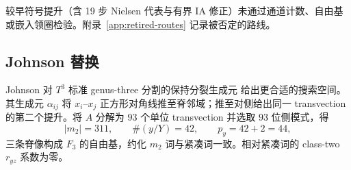\begin{remark}[被拒的紧凑提升]
较早符号提升（含 19 步 Nielsen 代表与有界 IA 修正）未通过通道计数、自由基或嵌入领圈检验。附录~\ref{app:retired-routes} 记录被否定的路线。
\end{remark}

\subsection{Johnson 替换}

Johnson 对 $T^3$ 标准 genus-three 分割的保持分裂生成元
\cite{Johnson2011} 给出更合适的搜索空间。其生成元
$\alpha_{ij}$ 将 $x_i$--$x_j$ 正方形对角线推至脊邻域；推至对侧给出同一 transvection 的第二个提升。将 $A$ 分解为 $93$ 个单位 transvection 并选取 $93$ 位侧模式，得
\[
|m_2|=311,\qquad \#(y/Y)=42,\qquad p_y=42+2=44,
\]
三条脊像构成 $F_3$ 的自由基，约化 $m_2$ 词与紧凑词一致。相对紧凑词的 class-two $r_{yz}$ 系数为零。


